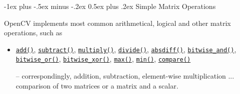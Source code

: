 \documentclass[10pt,landscape]{article}
\makeatletter
\renewcommand{\section}{\@startsection{section}{1}{0mm}%
                                {-1ex plus -.5ex minus -.2ex}%
                                {0.5ex plus .2ex}%
                                {\normalfont\large\bfseries}}
\makeatother
\begin{document}
\begin{multicols}{3}
\begin{tabular}{@{}p{\the\MyLen}%
                @{}p{\linewidth-\the\MyLen}@{}}
\end{tabular}


\section{Simple Matrix Operations}

OpenCV implements most common arithmetical, logical and
other matrix operations, such as

\begin{itemize}
\item
\texttt{\href{http://opencv.willowgarage.com/documentation/cpp/operations_on_arrays.html\#cv-add}{add()}},  \texttt{\href{http://opencv.willowgarage.com/documentation/cpp/operations_on_arrays.html\#cv-subtract}{subtract()}},
\texttt{\href{http://opencv.willowgarage.com/documentation/cpp/operations_on_arrays.html\#cv-multiply}{multiply()}},
\texttt{\href{http://opencv.willowgarage.com/documentation/cpp/operations_on_arrays.html\#cv-divide}{divide()}},
\texttt{\href{http://opencv.willowgarage.com/documentation/cpp/operations_on_arrays.html\#cv-absdiff}{absdiff()}},
\texttt{\href{http://opencv.willowgarage.com/documentation/cpp/operations_on_arrays.html\#bitwise-and}{bitwise\_and()}},  \texttt{\href{http://opencv.willowgarage.com/documentation/cpp/operations_on_arrays.html\#bitwise-or}{bitwise\_or()}},
\texttt{\href{http://opencv.willowgarage.com/documentation/cpp/operations_on_arrays.html\#bitwise-xor}{bitwise\_xor()}},
\texttt{\href{http://opencv.willowgarage.com/documentation/cpp/operations_on_arrays.html\#cv-max}{max()}},
\texttt{\href{http://opencv.willowgarage.com/documentation/cpp/operations_on_arrays.html\#cv-min}{min()}},
\texttt{\href{http://opencv.willowgarage.com/documentation/cpp/operations_on_arrays.html\#cv-compare}{compare()}}

-- correspondingly, addition, subtraction, element-wise multiplication ... comparison of two matrices or a matrix and a scalar.



\end{itemize}
\end{multicols}
\end{document}
